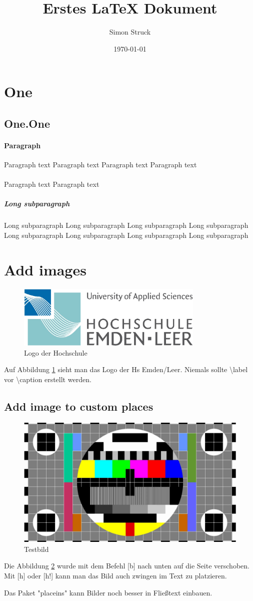 \documentclass{article}
\title{Erstes LaTeX Dokument}
\date{\today}
\author{Simon Struck}
\begin{document}
	\maketitle
	\newpage
	\tableofcontents
	\newpage
	\section{One}
	\subsection{One.One}
	\paragraph{Paragraph}
	Paragraph text
	Paragraph text
	Paragraph text
	Paragraph text
	\\
	\\
	Paragraph text
	Paragraph text
	\\
	\subparagraph[Short sub paragraph]{Long subparagraph} Long subparagraph Long subparagraph Long subparagraph Long subparagraph Long subparagraph Long subparagraph Long subparagraph Long subparagraph 
	\newpage
	\section{Add images}
	\begin{figure}
		\centering
		\includegraphics[width=0.5\linewidth,height=3cm]{img/logo.png}
		\caption{Logo der Hochschule}
		\label{fig:logo}
	\end{figure}
	Auf Abbildung \ref{fig:logo} sieht man das Logo der Hs Emden/Leer.
	Niemals sollte \textbackslash label vor \textbackslash caption erstellt werden.
	
	
	\subsection{Add image to custom places}
	
	\begin{figure}[b]
		\centering
		\includegraphics[width=0.5\linewidth]{img/test.jpg}
		\caption{Testbild}
		\label{fig:test}
		\end{figure}
	Die Abbildung \ref{fig:test} wurde mit dem Befehl [b] nach unten auf die Seite verschoben.
	Mit [h] oder [h!] kann man das Bild auch zwingen im Text zu platzieren.
	
	Das Paket "placeins" kann Bilder noch besser in Fließtext einbauen.
	\newpage
	\appendix
	\listoffigures
\end{document}
